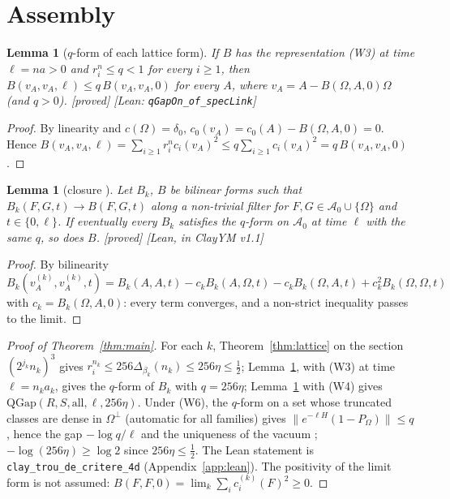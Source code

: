 \documentclass[11pt,a4paper]{article}
\theoremstyle{plain}
\newtheorem{lemma}[theorem]{Lemma}
\theoremstyle{definition}
\theoremstyle{remark}
\numberwithin{equation}{section}
\newcommand{\st}[1]{\textsf{[#1]}}
\newcommand{\cA}{\mathcal{A}}
\begin{document}
\section{Assembly}\label{sec:assembly}

\begin{lemma}[$q$-form of each lattice form]\label{lem:qform}
If $B$ has the representation (W3) at time $\ell=na>0$ and $r_i^n\le q<1$ for every $i\ge1$, then $B(v_A,v_A,\ell)\le q\,B(v_A,v_A,0)$ for
every $A$, where $v_A=A-B(\Omega,A,0)\Omega$ (and $q>0$). \st{proved} \st{Lean: \texttt{qGapOn\_of\_specLink}}
\end{lemma}
\begin{proof}
By linearity and $c(\Omega)=\delta_0$, $c_0(v_A)=c_0(A)-B(\Omega,A,0)=0$. Hence $B(v_A,v_A,\ell)=\sum_{i\ge1}r_i^nc_i(v_A)^2\le
q\sum_{i\ge1}c_i(v_A)^2=q\,B(v_A,v_A,0)$.
\end{proof}

\begin{lemma}[closure {\cite[\texttt{QGapOn.of\_tendsto}]{ClayYM}}]\label{lem:closure}
Let $B_k$, $B$ be bilinear forms such that $B_k(F,G,t)\to B(F,G,t)$ along a non-trivial filter for $F,G\in\cA_0\cup\{\Omega\}$ and
$t\in\{0,\ell\}$. If eventually every $B_k$ satisfies the $q$-form on $\cA_0$ at time $\ell$ with the same $q$, so does $B$.
\st{proved} \st{Lean, in ClayYM v1.1}
\end{lemma}
\begin{proof}
By bilinearity $B_k(v^{(k)}_A,v^{(k)}_A,t)=B_k(A,A,t)-c_kB_k(A,\Omega,t)-c_kB_k(\Omega,A,t)+c_k^2B_k(\Omega,\Omega,t)$ with
$c_k=B_k(\Omega,A,0)$: every term converges, and a non-strict inequality passes to the limit.
\end{proof}

\begin{proof}[Proof of Theorem~\ref{thm:main}]
For each $k$, Theorem~\ref{thm:lattice} on the section $(2^{j_k}n_k)^3$ gives $r_i^{n_k}\le256\Delta_{\beta_k}(n_k)\le256\eta\le\frac12$;
Lemma~\ref{lem:qform}, with (W3) at time $\ell=n_ka_k$, gives the $q$-form of $B_k$ with $q=256\eta$; Lemma~\ref{lem:closure} with (W4)
gives $\mathrm{QGap}(R,S,\text{all},\ell,256\eta)$. Under (W6), the $q$-form on a set whose truncated classes are dense in
$\Omega^\perp$ (automatic for all families) gives $\|e^{-\ell H}(1-P_\Omega)\|\le q$, hence the gap $-\log q/\ell$ and the uniqueness of
the vacuum \cite[\texttt{QGap.hasMassGap\_univ}, \texttt{QGap.vacuum\_unique}]{ClayYM}; $-\log(256\eta)\ge\log2$ since $256\eta\le\frac12$.
The Lean statement is \texttt{clay\_trou\_de\_critere\_4d} (Appendix~\ref{app:lean}). The positivity of the limit form is not assumed:
$B(F,F,0)=\lim_k\sum_ic_i^{(k)}(F)^2\ge0$.
\end{proof}
\end{document}
